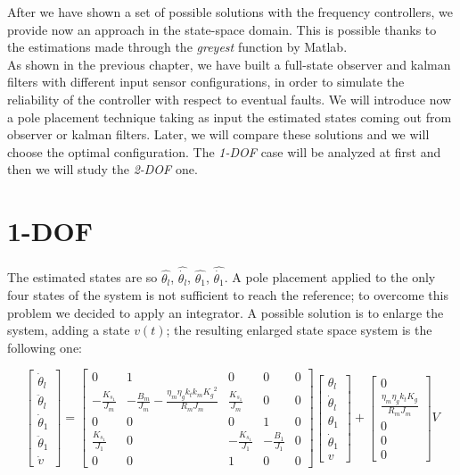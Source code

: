 
After we have shown a set of possible solutions with the frequency controllers, we provide now an approach in the state-space domain. This is possible thanks to the estimations made through the \textit{greyest} function by Matlab.\\
As shown in the previous chapter, we have built a full-state observer and kalman filters with different input sensor configurations, in order to simulate the reliability of the controller with respect to eventual faults. We will introduce now a pole placement technique taking as input the estimated states coming out from observer or kalman filters. Later, we will compare these solutions and we will choose the optimal configuration. The \textit{1-DOF} case will be analyzed at first and then we will study the \textit{2-DOF} one.

\section{1-DOF}
The estimated states are so $\hat{\theta_{l}}$, $\hat{\dot{\theta_{l}}}$, $\hat{\theta_{1}}$,  $\hat{\dot{\theta_{1}}}$. 
A pole placement applied to the only four states of the system is not sufficient to reach the reference; to overcome this problem we decided to apply an integrator. A possible solution is to enlarge the system, adding a state $v(t)$; the resulting enlarged state space system is the following one:

\begin{equation}
	\begin{bmatrix}
		\dot\theta_l \\
		\ddot\theta_l \\
		\dot\theta_1 \\
		\ddot\theta_1 \\
		\dot{v}
	\end{bmatrix}
	=
	\begin{bmatrix}
		0 &1 & 0 & 0 & 0 \\
		-\frac{K_{s_1}}{J_m} & -\frac{B_m}{J_m}-\frac{\eta_m \eta_g k_t k_m {K_g}^2}{R_m J_m}  & \frac{K_{s_1}}{J_m} & 0 & 0 \\
		0 & 0 & 0 & 1 & 0 \\
		\frac{K_{s_1}}{J_1} & 0 & -\frac{K_{s_1}}{J_1} & -\frac{B_1}{J_1} & 0 \\
		0 & 0 & 1 & 0 & 0 
	\end{bmatrix}
	\begin{bmatrix}
		\theta_l \\
		\dot\theta_l \\
		\theta_1 \\
		\dot\theta_1 \\
		v
	\end{bmatrix}
	+
	\begin{bmatrix}
		0 \\
		\frac{\eta_m \eta_g k_t K_g}{R_m J_m} \\
		0 \\
		0 \\
		0
	\end{bmatrix}
	V
\end{equation}

